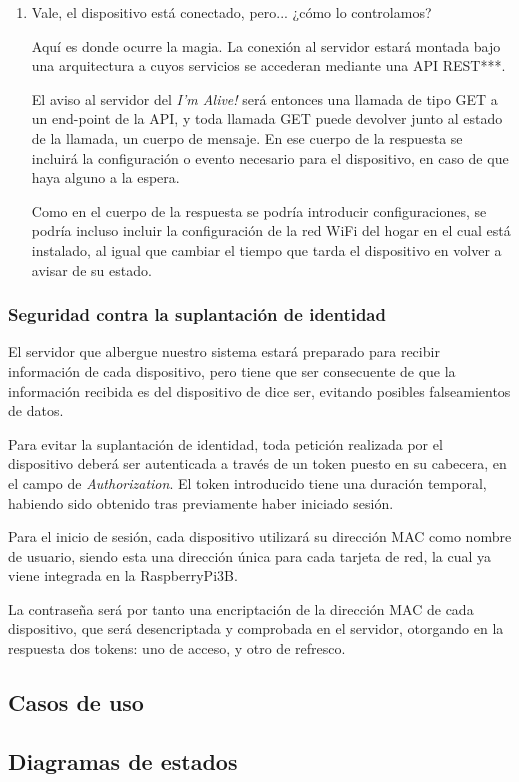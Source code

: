\begin{enumerate}
    \item Vale, el dispositivo está conectado, pero... ¿cómo lo controlamos?
    
    Aquí es donde ocurre la magia. La conexión al servidor estará montada bajo una arquitectura a cuyos servicios se accederan mediante una API REST***.
    
    El aviso al servidor del \textit{I'm Alive!} será entonces una llamada de tipo GET a un end-point de la API, y toda llamada GET puede devolver junto al estado de la llamada, un cuerpo de mensaje.
    En ese cuerpo de la respuesta se incluirá la configuración o evento necesario para el dispositivo, en caso de que haya alguno a la espera.
    
    Como en el cuerpo de la respuesta se podría introducir configuraciones, se podría incluso incluir la configuración de la red WiFi del hogar en el cual está instalado, al igual que cambiar el tiempo que tarda el dispositivo en volver a avisar de su estado.
    
\end{enumerate}

    \subsubsection{Seguridad contra la suplantación de identidad}

    El servidor que albergue nuestro sistema estará preparado para recibir información de cada dispositivo, pero tiene que ser consecuente de que la información recibida es del dispositivo de dice ser, evitando posibles falseamientos de datos.
    
    Para evitar la suplantación de identidad, toda petición realizada por el dispositivo deberá ser autenticada a través de un token puesto en su cabecera, en el campo de \textit{Authorization}. El token introducido tiene una duración temporal, habiendo sido obtenido tras previamente haber iniciado sesión.
    
    Para el inicio de sesión, cada dispositivo utilizará su dirección MAC como nombre de usuario, siendo esta una dirección única para cada tarjeta de red, la cual ya viene integrada en la RaspberryPi3B.
    
    La contraseña será por tanto una encriptación de la dirección MAC de cada dispositivo, que será desencriptada y comprobada en el servidor, otorgando en la respuesta dos tokens: uno de acceso, y otro de refresco.

\subsection{Casos de uso}

\subsection{Diagramas de estados}